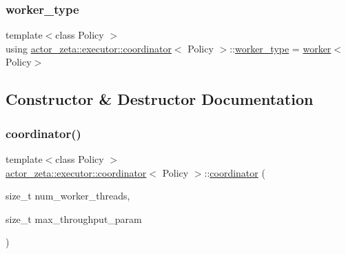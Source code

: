 \mbox{\label{classactor__zeta_1_1executor_1_1coordinator_a97ba3b1f4578cf25c7311e177edf8c59}} 
\subsubsection{\texorpdfstring{worker\+\_\+type}{worker\_type}}
{\footnotesize\ttfamily template$<$class Policy $>$ \\
using \hyperlink{classactor__zeta_1_1executor_1_1coordinator}{actor\+\_\+zeta\+::executor\+::coordinator}$<$ Policy $>$\+::\hyperlink{classactor__zeta_1_1executor_1_1coordinator_a97ba3b1f4578cf25c7311e177edf8c59}{worker\+\_\+type} =  \hyperlink{classactor__zeta_1_1executor_1_1worker}{worker}$<$Policy$>$}



\subsection{Constructor \& Destructor Documentation}
\mbox{\label{classactor__zeta_1_1executor_1_1coordinator_a8775cdb668847488833bf434433971bd}} 
\subsubsection{\texorpdfstring{coordinator()}{coordinator()}}
{\footnotesize\ttfamily template$<$class Policy $>$ \\
\hyperlink{classactor__zeta_1_1executor_1_1coordinator}{actor\+\_\+zeta\+::executor\+::coordinator}$<$ Policy $>$\+::\hyperlink{classactor__zeta_1_1executor_1_1coordinator}{coordinator} (\begin{DoxyParamCaption}\item[{size\+\_\+t}]{num\+\_\+worker\+\_\+threads,  }\item[{size\+\_\+t}]{max\+\_\+throughput\+\_\+param }\end{DoxyParamCaption})\hspace{0.3cm}{\ttfamily [inline]}}



